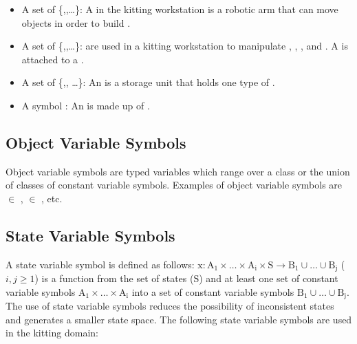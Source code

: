 \begin{itemize}
\item A set of  \{,,\ldots\}: A  in the kitting workstation is a robotic arm that can move objects in order to build .

\item A set of  \{,,\ldots\}:  are used in a kitting workstation to manipulate , , , and . A  is attached to a .

\item A set of   \{,, \ldots\}: An  is a storage unit that holds one type of .

\item A symbol  : An  is made up of .
\end{itemize}

\subsection{Object Variable Symbols}
Object variable symbols are typed variables which range over a class or the union of classes of constant variable symbols. Examples of object variable symbols are  $\in$ ,  $\in$ , etc.

\subsection{State Variable Symbols}
\label{subsubsect:State_Variable_Symbols}
A state variable symbol is defined as follows:
$\mathrm{x: A_1\times \dots\times A_i\times S\rightarrow B_1\cup\dots\cup B_j}$ ($i, j\geq 1$) is a function from the set of states ($\mathrm{S}$) and at least one set of constant variable symbols $\mathrm{A_1\times \dots\times A_i}$ into a set of constant variable symbols $\mathrm{B_1\cup\dots\cup B_j}$.\\

\noindent
The use of state variable symbols reduces the possibility of inconsistent states and generates a smaller state space. The following state variable symbols are used in the kitting domain:

